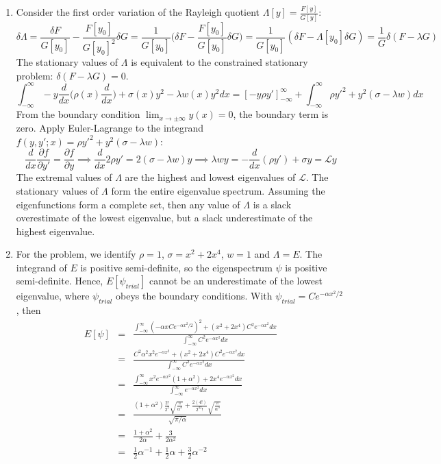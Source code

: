 \documentclass[a4paper]{article}
\begin{document}
\begin{ans}\leavevmode
\begin{enumerate}[label=(\alph*)]
\item Consider the first order variation of the Rayleigh quotient $\Lambda[y]=\frac{F[y]}{G[y]}$:
$$\delta\Lambda=\frac{\delta F}{G[y_0]}-\frac{F[y_0]}{G[y_0]^2}\delta G=\frac{1}{G[y_0]}\bigg(\delta F-\frac{F[y_0]}{G[y_0]}\delta G\bigg)=\frac{1}{G[y_0]}(\delta F-\Lambda[y_0]\delta G)=\frac{1}{G}\delta(F-\lambda G)$$
The stationary values of $\Lambda$ is equivalent to the constrained stationary problem: $\delta (F-\lambda G)=0$.
$$\int_{-\infty}^\infty -y\frac{d}{dx}\bigg(\rho(x)\frac{d}{dx}\bigg)+\sigma(x)y^2-\lambda w(x)y^2dx=[-y\rho y']_{-\infty}^\infty+\int_{-\infty}^\infty\rho y'^2+y^2(\sigma-\lambda w)dx$$
From the boundary condition $\lim_{x\rightarrow\pm\infty}y(x)=0$, the boundary term is zero. Apply Euler-Lagrange to the integrand $f(y,y';x)=\rho y'^2+y^2(\sigma-\lambda w)$:
$$\frac{d}{dx}\frac{\partial f}{\partial y'}=\frac{\partial f}{\partial y}\implies\frac{d}{dx}2\rho y'=2(\sigma-\lambda w)y\implies\lambda wy=-\frac{d}{dx}(\rho y')+\sigma y=\mathcal{L}y$$
The extremal values of $\Lambda$ are the highest and lowest eigenvalues of $\mathcal{L}$. The stationary values of $\Lambda$ form the entire eigenvalue spectrum. Assuming the eigenfunctions form a complete set, then any value of $\Lambda$ is a slack overestimate of the lowest eigenvalue, but a slack underestimate of the highest eigenvalue.
\item For the problem, we identify $\rho=1$, $\sigma=x^2+2x^4$, $w=1$ and $\Lambda=E$. The integrand of $E$ is positive semi-definite, so the eigenspectrum $\psi$ is positive semi-definite. Hence, $E[\psi_{trial}]$ cannot be an underestimate of the lowest eigenvalue, where $\psi_{trial}$ obeys the boundary conditions. With $\psi_{trial}=Ce^{-\alpha x^2/2}$, then
\begin{eqnarray}
E[\psi]&=&\frac{\int_{-\infty}^\infty(-\alpha xCe^{-\alpha x^2/2})^2+(x^2+2x^4)C^2e^{-\alpha x^2}dx}{\int_{-\infty}^\infty C^2e^{-\alpha x^2}dx}\nonumber\\&=&\frac{C^2\alpha^2x^2e^{-\alpha x^2}+(x^2+2x^4)C^2e^{-\alpha x^2}dx}{\int_{-\infty}^\infty C^2e^{-\alpha x^2}dx}\nonumber\\&=&\frac{\int_{-\infty}^\infty x^2e^{-\alpha x^2}(1+\alpha^2)+2x^4e^{-\alpha x^2}dx}{\int_{-\infty}^\infty e^{-\alpha x^2}dx}\nonumber\\&=&\frac{(1+\alpha^2)\frac{2!}{2^2}\sqrt{\frac{\pi}{\alpha^3}}+\frac{2(4!)}{2^42!}\sqrt{\frac{\pi}{\alpha^5}}}{\sqrt{\pi/\alpha}}\nonumber\\&=&\frac{1+\alpha^2}{2\alpha}+\frac{3}{2\alpha^2}\nonumber\\&=&\frac{1}{2}\alpha^{-1}+\frac{1}{2}\alpha+\frac{3}{2}\alpha^{-2}\nonumber

\end{eqnarray}
\end{enumerate}
\end{ans}
\end{document}

